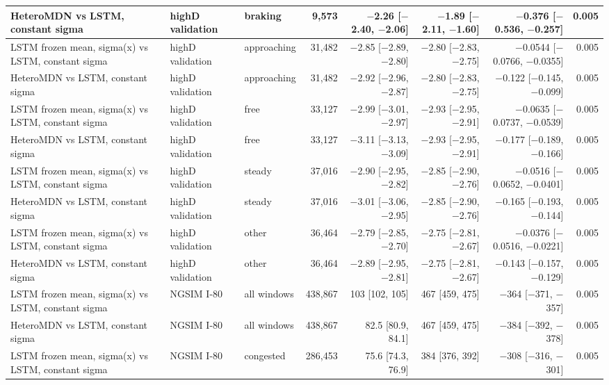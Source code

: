 \begin{longtable}{lllrrrrr}
\midrule
HeteroMDN vs LSTM, constant sigma & highD validation & braking & 9,573 & $-$2.26 [$-$2.40, $-$2.06] & $-$1.89 [$-$2.11, $-$1.60] & $-$0.376 [$-$0.536, $-$0.257] & 0.005 \\
\midrule
LSTM frozen mean, sigma(x) vs LSTM, constant sigma & highD validation & approaching & 31,482 & $-$2.85 [$-$2.89, $-$2.80] & $-$2.80 [$-$2.83, $-$2.75] & $-$0.0544 [$-$0.0766, $-$0.0355] & 0.005 \\
\midrule
HeteroMDN vs LSTM, constant sigma & highD validation & approaching & 31,482 & $-$2.92 [$-$2.96, $-$2.87] & $-$2.80 [$-$2.83, $-$2.75] & $-$0.122 [$-$0.145, $-$0.099] & 0.005 \\
\midrule
LSTM frozen mean, sigma(x) vs LSTM, constant sigma & highD validation & free & 33,127 & $-$2.99 [$-$3.01, $-$2.97] & $-$2.93 [$-$2.95, $-$2.91] & $-$0.0635 [$-$0.0737, $-$0.0539] & 0.005 \\
\midrule
HeteroMDN vs LSTM, constant sigma & highD validation & free & 33,127 & $-$3.11 [$-$3.13, $-$3.09] & $-$2.93 [$-$2.95, $-$2.91] & $-$0.177 [$-$0.189, $-$0.166] & 0.005 \\
\midrule
LSTM frozen mean, sigma(x) vs LSTM, constant sigma & highD validation & steady & 37,016 & $-$2.90 [$-$2.95, $-$2.82] & $-$2.85 [$-$2.90, $-$2.76] & $-$0.0516 [$-$0.0652, $-$0.0401] & 0.005 \\
\midrule
HeteroMDN vs LSTM, constant sigma & highD validation & steady & 37,016 & $-$3.01 [$-$3.06, $-$2.95] & $-$2.85 [$-$2.90, $-$2.76] & $-$0.165 [$-$0.193, $-$0.144] & 0.005 \\
\midrule
LSTM frozen mean, sigma(x) vs LSTM, constant sigma & highD validation & other & 36,464 & $-$2.79 [$-$2.85, $-$2.70] & $-$2.75 [$-$2.81, $-$2.67] & $-$0.0376 [$-$0.0516, $-$0.0221] & 0.005 \\
\midrule
HeteroMDN vs LSTM, constant sigma & highD validation & other & 36,464 & $-$2.89 [$-$2.95, $-$2.81] & $-$2.75 [$-$2.81, $-$2.67] & $-$0.143 [$-$0.157, $-$0.129] & 0.005 \\
\midrule
LSTM frozen mean, sigma(x) vs LSTM, constant sigma & NGSIM I-80 & all windows & 438,867 & 103 [102, 105] & 467 [459, 475] & $-$364 [$-$371, $-$357] & 0.005 \\
\midrule
HeteroMDN vs LSTM, constant sigma & NGSIM I-80 & all windows & 438,867 & 82.5 [80.9, 84.1] & 467 [459, 475] & $-$384 [$-$392, $-$378] & 0.005 \\
\midrule
LSTM frozen mean, sigma(x) vs LSTM, constant sigma & NGSIM I-80 & congested & 286,453 & 75.6 [74.3, 76.9] & 384 [376, 392] & $-$308 [$-$316, $-$301] & 0.005 \\

\end{longtable}
